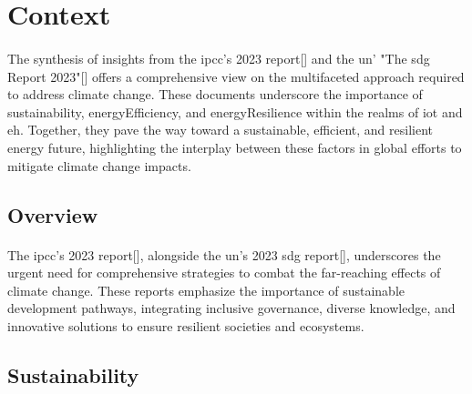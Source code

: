\section{Context}

\paragraph{}
The synthesis of insights from the \gls{ipcc}'s 2023 report[\cite{IPCC_SynthesisReport2023}] and the \gls{un}' "The \gls{sdg} Report 2023"[\cite{UN_SDGReport2023}] offers a comprehensive view on the multifaceted approach required to address climate change. These documents underscore the importance of sustainability, \gls{energyEfficiency}, and \gls{energyResilience} within the realms of \gls{iot} and \gls{eh}. Together, they pave the way toward a sustainable, efficient, and resilient energy future, highlighting the interplay between these factors in global efforts to mitigate climate change impacts.

\subsection{Overview}

    \paragraph{}
    The \gls{ipcc}'s 2023 report[\cite{IPCC_SynthesisReport2023}], alongside the \gls{un}'s 2023 \gls{sdg} report[\cite{UN_SDGReport2023}], underscores the urgent need for comprehensive strategies to combat the far-reaching effects of climate change. These reports emphasize the importance of sustainable development pathways, integrating inclusive governance, diverse knowledge, and innovative solutions to ensure resilient societies and ecosystems.


\subsection{Sustainability}

